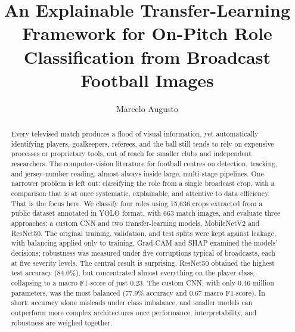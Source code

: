 \documentclass[preprint,12pt]{elsarticle}
\begin{document}
\begin{frontmatter}

\title{An Explainable Transfer-Learning Framework for On-Pitch Role Classification from Broadcast Football Images}

\author[label1]{Marcelo Augusto}

\begin{abstract}
Every televised match produces a flood of visual information, yet automatically identifying players, goalkeepers, referees, and the ball still tends to rely on expensive processes or proprietary tools, out of reach for smaller clubs and independent researchers. The computer-vision literature for football centres on detection, tracking, and jersey-number reading, almost always inside large, multi-stage pipelines. One narrower problem is left out: classifying the role from a single broadcast crop, with a comparison that is at once systematic, explainable, and attentive to data efficiency. That is the focus here. We classify four roles using 15,636 crops extracted from a public dataset annotated in YOLO format, with 663 match images, and evaluate three approaches: a custom CNN and two transfer-learning models, MobileNetV2 and ResNet50. The original training, validation, and test splits were kept against leakage, with balancing applied only to training. Grad-CAM and SHAP examined the models' decisions; robustness was measured under five corruptions typical of broadcasts, each at five severity levels. The central result is surprising. ResNet50 obtained the highest test accuracy (84.0\%), but concentrated almost everything on the player class, collapsing to a macro F1-score of just 0.23. The custom CNN, with only 0.46 million parameters, was the most balanced (77.9\% accuracy and 0.67 macro F1-score). In short: accuracy alone misleads under class imbalance, and smaller models can outperform more complex architectures once performance, interpretability, and robustness are weighed together.
\end{abstract}

\begin{graphicalabstract}
\end{graphicalabstract}


\end{frontmatter}
\end{document}
